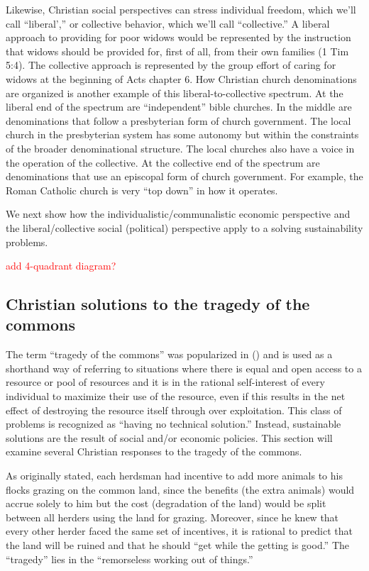 \documentclass[12pt]{article}
\newcommand{\ins}[1]{\textcolor{red}{#1}}
\begin{document}
Likewise, Christian social perspectives can stress individual freedom, which we'll call ``liberal','' or collective behavior, which
we'll call ``collective.'' A liberal approach to providing for poor widows would be represented by the instruction that widows should be 
provided for, first of all, from their own families (1 Tim 5:4). 
The collective approach is represented by the group effort of caring for widows at the beginning of Acts chapter 6.
How Christian church denominations are organized is another example of this liberal-to-collective spectrum.
At the liberal end of the spectrum are ``independent'' bible churches. In the middle are denominations that follow a presbyterian form of church 
government. The local church in the presbyterian system has some autonomy but within the constraints of the broader 
denominational structure. The local churches also have a voice in the operation of the collective. At the collective end of the spectrum 
are denominations that use an episcopal form of church government. For example, the Roman Catholic church is very ``top down'' 
in how it operates.

We next show how the individualistic/communalistic economic perspective and the liberal/collective social (political) perspective
apply to a solving sustainability problems.

\ins{add 4-quadrant diagram?}

\subsection{Christian solutions to the tragedy of the commons}
\label{sec:totc}
The term ``tragedy of the commons'' was popularized in (\textcite{Hardin68}) %
and is used as a shorthand way of referring to
situations where there is equal and open access to a resource or pool of resources and it is in the rational self-interest of
every individual to maximize their use of the resource, even if this results in the net effect of destroying the
resource itself through over exploitation. This class of problems is recognized as ``having no technical solution.''
Instead, sustainable solutions are the result of social and/or economic policies. This section will examine several
Christian responses to the tragedy of the commons.

As originally stated, each herdsman had incentive to add more animals to his flocks grazing on the common land, since
the benefits (the extra animals) would accrue solely to him but the cost (degradation of the land) would be split between
all herders using the land for grazing. Moreover, since he knew that every other herder faced the same set of
incentives, it is rational to predict that the land will be ruined and that he should ``get while the getting is good.''
The ``tragedy'' lies in the ``remorseless working out of things.''
\end{document}
